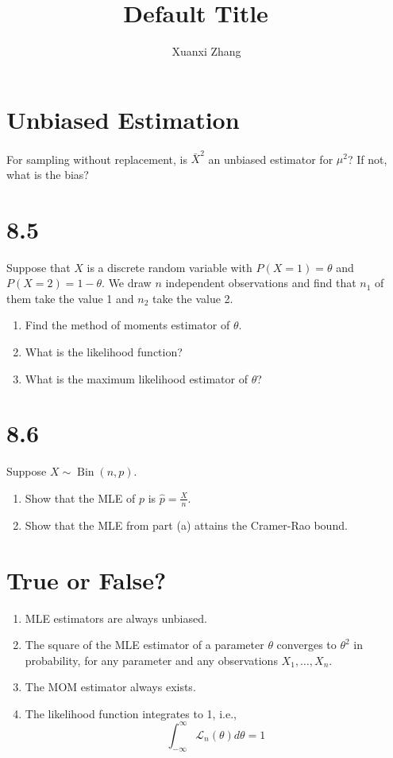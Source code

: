 \documentclass{article}%
\title{\huge Default Title \ \normalsize}
\author{Xuanxi Zhang}
\newif\ifwithrefs
\begin{document}
\maketitle

\section{Unbiased Estimation}
For sampling without replacement, is $\bar{X}^2$ an unbiased estimator for $\mu^2$? If not, what is the bias?

\section{8.5} Suppose that $X$ is a discrete random variable with $P(X=1)=\theta$ and $P(X=2)=1-\theta$. We draw $n$ independent observations and find that $n_1$ of them take the value 1 and $n_2$ take the value 2.
\begin{enumerate}
    \item Find the method of moments estimator of $\theta$.
    \item What is the likelihood function?
    \item What is the maximum likelihood estimator of $\theta$?
\end{enumerate}



\section{8.6} Suppose $X \sim \operatorname{Bin}(n, p)$.
\begin{enumerate}
    \item Show that the MLE of $p$ is $\hat{p}=\frac{X}{n}$.
    \item Show that the MLE from part (a) attains the Cramer-Rao bound.
\end{enumerate}

    
\section{True or False?}
\begin{enumerate}
    \item MLE estimators are always unbiased.
    \item The square of the MLE estimator of a parameter $\theta$ converges to $\theta^2$ in probability, for any parameter and any observations $X_1, \ldots, X_n$.
    \item The MOM estimator always exists.
    \item The likelihood function integrates to 1, i.e.,
    $$
    \int_{-\infty}^{\infty} \mathcal{L}_n(\theta) d \theta=1
    $$
\end{enumerate}

\ifwithrefs
  
\fi
\end{document}
